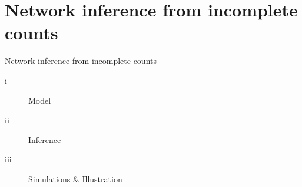 \documentclass[11pt]{beamer}
\newcommand{\bleu}[1]{\textcolor{Framableulight}{#1}}
\begin{document}
 
\section{Network inference from incomplete counts}
\begin{frame}{}
\begin{center}
\Huge{\bleu{Network inference from incomplete counts}}
\end{center}
\begin{center}
\begin{description}
\item[i] Model
\item[ii]  Inference
\item[iii] Simulations \& Illustration
\end{description}
\end{center}
\end{frame}
\end{document}

